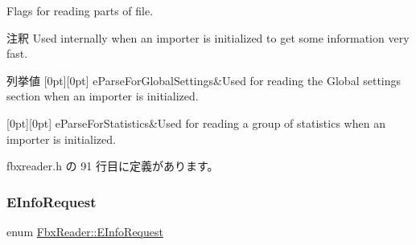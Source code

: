 Flags for reading parts of file. \begin{DoxyRemark}{注釈}
Used internally when an importer is initialized to get some information very fast. 
\end{DoxyRemark}
\begin{DoxyEnumFields}{列挙値}
[0pt][0pt]{}\mbox{\label{class_fbx_reader_a1a14bd907bcda7dd48ba9b0a6236b7b8a916239cfabb05bb13e64fab696226011}} 
e\+Parse\+For\+Global\+Settings&Used for reading the Global settings section when an importer is initialized. \\
\hline

[0pt][0pt]{}\mbox{\label{class_fbx_reader_a1a14bd907bcda7dd48ba9b0a6236b7b8a31ba0d93719d2c2670ef2323447a8041}} 
e\+Parse\+For\+Statistics&Used for reading a group of statistics when an importer is initialized. \\
\hline

\end{DoxyEnumFields}


 fbxreader.\+h の 91 行目に定義があります。

\mbox{\label{class_fbx_reader_a33badbb2641958ab0772ec2c06a71e11}} 
\subsubsection{\texorpdfstring{E\+Info\+Request}{EInfoRequest}}
{\footnotesize\ttfamily enum \hyperlink{class_fbx_reader_a33badbb2641958ab0772ec2c06a71e11}{Fbx\+Reader\+::\+E\+Info\+Request}}

